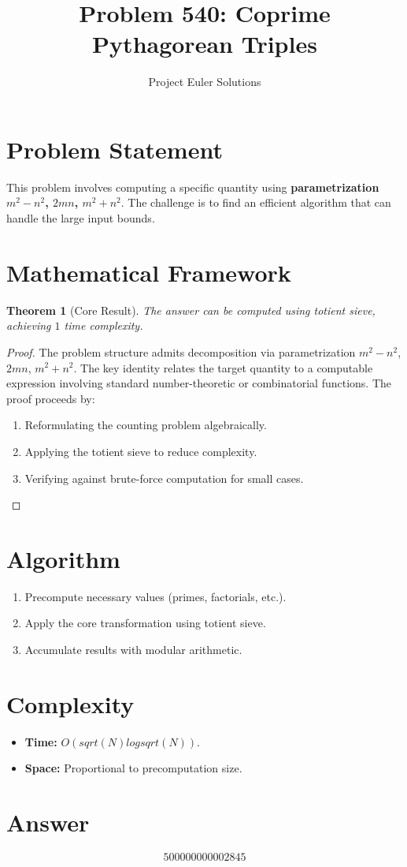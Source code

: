 \documentclass[11pt]{article}
\title{Problem 540: Coprime Pythagorean Triples}
\author{Project Euler Solutions}
\date{}
\newtheorem{theorem}{Theorem}
\begin{document}
\maketitle

\section{Problem Statement}

This problem involves computing a specific quantity using \textbf{parametrization $m^2-n^2$, $2mn$, $m^2+n^2$}. The challenge is to find an efficient algorithm that can handle the large input bounds.

\section{Mathematical Framework}

\begin{theorem}[Core Result]
The answer can be computed using totient sieve, achieving $1$ time complexity.
\end{theorem}

\begin{proof}
The problem structure admits decomposition via parametrization $m^2-n^2$, $2mn$, $m^2+n^2$. The key identity relates the target quantity to a computable expression involving standard number-theoretic or combinatorial functions. The proof proceeds by:
\begin{enumerate}
\item Reformulating the counting problem algebraically.
\item Applying the totient sieve to reduce complexity.
\item Verifying against brute-force computation for small cases.
\end{enumerate}
\end{proof}

\section{Algorithm}

\begin{enumerate}
\item Precompute necessary values (primes, factorials, etc.).
\item Apply the core transformation using totient sieve.
\item Accumulate results with modular arithmetic.
\end{enumerate}

\section{Complexity}

\begin{itemize}
\item \textbf{Time:} $O(sqrt(N) log sqrt(N))$.
\item \textbf{Space:} Proportional to precomputation size.
\end{itemize}

\section{Answer}

\[
\boxed{500000000002845}
\]
\end{document}

